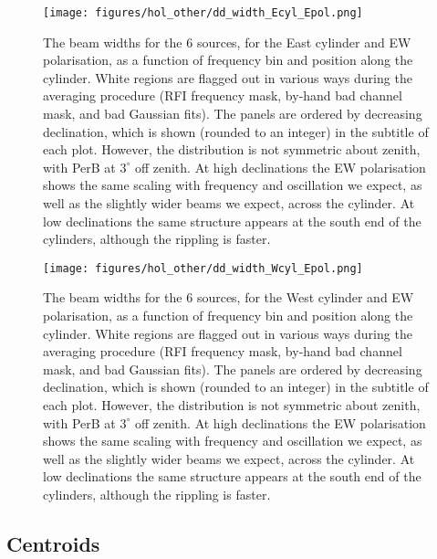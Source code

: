 \begin{figure}[h!]
\begin{center}
\texttt{[image: figures/hol\_other/dd\_width\_Ecyl\_Epol.png]}
\caption{The beam widths for the 6 sources, for the East cylinder and EW polarisation, as a function of frequency bin and position along the cylinder. White regions are flagged out in various ways during the averaging procedure (RFI frequency mask, by-hand bad channel mask, and bad Gaussian fits). The panels are ordered by decreasing declination, which is shown (rounded to an integer) in the subtitle of each plot. However, the distribution is not symmetric about zenith, with PerB at $3^{\circ}$ off zenith. \newline At high declinations the EW polarisation shows the same scaling with frequency and oscillation we expect, as well as the slightly wider beams we expect, across the cylinder. At low declinations the same structure appears at the south end of the cylinders, although the rippling is faster.}
\end{center}
\end{figure}

\begin{figure}[h!]
\begin{center}
\texttt{[image: figures/hol\_other/dd\_width\_Wcyl\_Epol.png]}
\caption{The beam widths for the 6 sources, for the West cylinder and EW polarisation, as a function of frequency bin and position along the cylinder. White regions are flagged out in various ways during the averaging procedure (RFI frequency mask, by-hand bad channel mask, and bad Gaussian fits). The panels are ordered by decreasing declination, which is shown (rounded to an integer) in the subtitle of each plot. However, the distribution is not symmetric about zenith, with PerB at $3^{\circ}$ off zenith. \newline At high declinations the EW polarisation shows the same scaling with frequency and oscillation we expect, as well as the slightly wider beams we expect, across the cylinder. At low declinations the same structure appears at the south end of the cylinders, although the rippling is faster.}
\end{center}
\end{figure}

\newpage

\subsection{Centroids}

